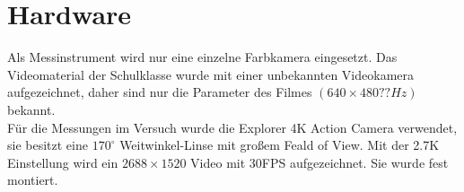\section{Hardware}
Als Messinstrument wird nur eine einzelne Farbkamera eingesetzt. Das Videomaterial der Schulklasse wurde mit einer unbekannten Videokamera aufgezeichnet, daher sind nur die Parameter des Filmes $(640 \times 480 ??Hz)$ bekannt.\\
Für die Messungen im Versuch wurde die Explorer 4K Action Camera verwendet, sie besitzt eine $170^\circ$ Weitwinkel-Linse mit großem Feald of View. Mit der 2.7K Einstellung wird ein $2688 \times 1520$ Video mit 30FPS aufgezeichnet. Sie wurde fest montiert.